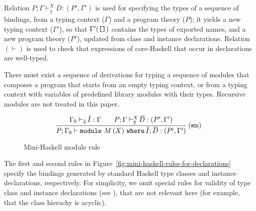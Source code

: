 Relation $P;\Gamma \vdash_{\Uparrow}^X \overline{\!D}:(P',\Gamma')$ is
used for specifying the types of a sequence of bindings, from a typing
context ($\Gamma$) and a program theory ($P$); it yields a new typing
context ($\Gamma'$), so that $\Gamma'(\mbox{\tt{[]}})$ contains the
types of exported names, and a new program theory ($P'$), updated from
class and instance declarations. Relation $(\vdash)$ is used to
check that expressions of core-Haskell that occur in declarations are
well-typed.

There must exist a sequence of derivations for typing a sequence of
modules that composes a program that starts from an empty typing
context, or from a typing context with variables of predefined library
modules with their types. Recursive modules are not treated in this
paper.

\begin{figure}[b]
\[ \begin{array}{cc}
	\displaystyle\frac
	 {\begin{array}{ll}
           \Gamma_0 \vdash_{\Downarrow} \overline{\!I} : \Gamma\:\: & \:\:P;\Gamma \vdash_{\Uparrow}^X \overline{\!D} : (P',\Gamma') 
          \end{array}}
	 {P;\Gamma_0 \vdash \module\ M\, (\exportC)\ \where\ \overline{\!I};\, \overline{\!D} : (P',\Gamma')} \:(\MODULE)
\end{array} \]
\caption{Mini-Haskell module rule} 
\label{fig:mini-haskell-module-rule}
\end{figure}

The first and second rules in
Figure~\ref{fig:mini-haskell-rules-for-declarations} specify the
bindings generated by standard Haskell type classes and instance
declarations, respectively.  For simplicity, we omit special rules for
validity of type class and instance declarations (see \cite{GHC}),
that are not relevant here (for example, that the class hierachy is
acyclic).

